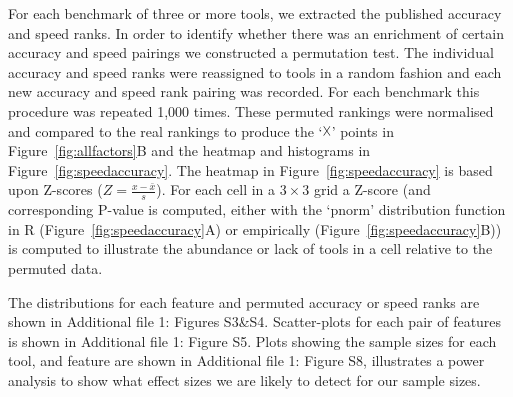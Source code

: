 \documentclass{bmcart}
\begin{document}
%
%

For each benchmark of three or more tools, we extracted the published
accuracy and speed ranks. In order to identify whether there was an
enrichment of certain accuracy and speed pairings we constructed a
permutation test. The individual accuracy and speed ranks were
reassigned to tools in a random fashion and each new accuracy and
speed rank pairing was recorded. For each benchmark this procedure was
repeated 1,000 times. These permuted rankings were normalised and
compared to the real rankings to produce the ‘$\vartimes$’ points in
Figure~\ref{fig:allfactors}B and the heatmap and histograms in
Figure~\ref{fig:speedaccuracy}. The heatmap in
Figure~\ref{fig:speedaccuracy} is based upon Z-scores
($Z=\frac{x-\bar{x}}{s}$). For each cell in a $3\times 3$ grid
a Z-score (and corresponding P-value is computed, either with the `pnorm' distribution function in R (Figure~\ref{fig:speedaccuracy}A) or empirically (Figure~\ref{fig:speedaccuracy}B)) is computed to illustrate the abundance or lack of tools in
a cell relative to the permuted data.

{\color{black} The distributions for each feature and permuted accuracy or speed ranks are shown in {\color{black} Additional file 1: Figures S3\&S4}. Scatter-plots for each pair of features is shown in {\color{black} Additional file 1: Figure S5}. Plots showing the sample sizes for each tool, and feature are shown in {\color{black} Additional file 1: Figure S8}, illustrates a power analysis to show what effect sizes we are likely to detect for our sample sizes. }
\end{document}
